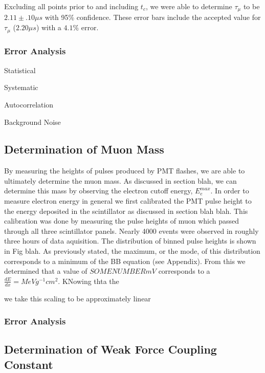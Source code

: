 Excluding all points prior to and including $t_{c}$, we were able to determine $\tau_{\mu}$ to be $2.11 \pm .10 \mu s$ with 95\% confidence.  These error bars include the accepted value for $\tau_{\mu}$ ($2.20\mu s$) with a $4.1\%$ error.

\subsubsection{Error Analysis}

Statistical

Systematic

Autocorrelation

Background Noise

\subsection{Determination of Muon Mass}

By measuring the heights of pulses produced by PMT flashes, we are able to ultimately determine the muon mass.  As discussed in section blah, we can determine this mass by observing the electron cutoff energy, $E_{e}^{max}$. In order to measure electron energy in general we first calibrated the PMT pulse height to the energy deposited in the scintillator as discussed in section blah blah. This calibration was done by measuring the pulse heights of muon which passed through all three scintillator panels.  Nearly 4000 events were observed in roughly three hours of data aquisition.  The distribution of binned pulse heights is shown in Fig blah.  As previously stated, the maximum, or the mode, of this distribution corresponds to a minimum of the BB equation (see Appendix).  From this we determined that a value of $SOME NUMBER mV$ corresponds to a $\frac{dE}{dx}= MeV g^{-1} cm^{2}$.  KNowing thta the  

we take this scaling to be approximately linear 


\subsubsection{Error Analysis}

\subsection{Determination of Weak Force Coupling Constant}

